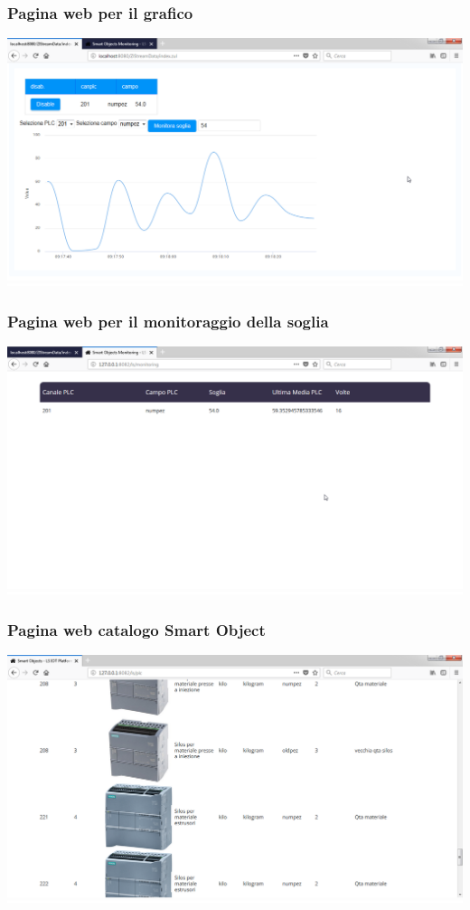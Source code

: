 \documentclass{beamer}
\begin{document}
\begin{frame}
\frametitle{Pagina web per il grafico}
\includegraphics[width=1\textwidth]{images/grafico-zk.png}
\end{frame}

\begin{frame}
\frametitle{Pagina web per il monitoraggio della soglia}
\includegraphics[width=1\textwidth]{images/pagina-monitoraggio-web.png}
\end{frame}

\begin{frame}
\frametitle{Pagina web catalogo Smart Object}
\includegraphics[width=1\textwidth]{images/SmartObjectsPlatform.png}
\end{frame}
\end{document}
